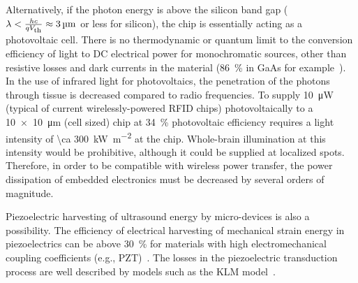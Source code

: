Alternatively, if the photon energy is above the silicon band gap ($\lambda < \frac{h c}{qV_{\text{\scriptsize th}}} \approx \SI{3}{\micro\meter}$ or less for silicon), the chip is essentially acting as a photovoltaic cell.
There is no thermodynamic or quantum limit to the conversion efficiency of light to DC electrical power for monochromatic sources, other than resistive losses and dark currents in the material (\SI{86}{\percent} in GaAs for example~\cite{bett08}). 
In the use of infrared light for photovoltaics, the penetration of the photons through tissue is decreased compared to radio frequencies.
To supply \SI{10}{\micro\watt} (typical of current wirelessly-powered RFID chips) photovoltaically to a \SI{10 x 10}{\micro\meter} (cell sized) chip at \SI{34}{\percent} photovoltaic efficiency requires a light intensity of \SI{\ca 300}{\kilo\watt\per\meter\squared} at the chip.
Whole-brain illumination at this intensity would be prohibitive, although it could be supplied at localized spots.
Therefore, in order to be compatible with wireless power transfer, the power dissipation of embedded electronics must be decreased by several orders of magnitude.

Piezoelectric harvesting of ultrasound energy by micro-devices is also a possibility. The efficiency of electrical harvesting of mechanical strain energy in piezoelectrics can be above \SI{30}{\percent} for materials with high electromechanical coupling coefficients (e.g., PZT)~\cite{safari08, xu12}. The losses in the piezoelectric transduction process are well described by models such as the KLM model~\cite{krimholtz70,castillo03}.

